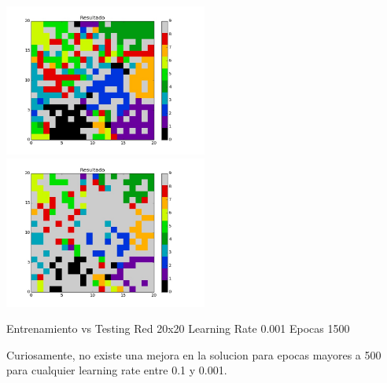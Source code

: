 \includegraphics[width=0.5\textwidth]{img/ej2_train_M_20_lrate_001_epocas_1500}
\includegraphics[width=0.5\textwidth]{img/ej2_test_M_20_lrate_001_epocas_1500}
{\center \footnotesize Entrenamiento vs Testing Red 20x20 Learning Rate 0.001 Epocas 1500\par}

Curiosamente, no existe una mejora en la solucion para epocas mayores a 500 para cualquier learning rate entre 0.1 y 0.001.

